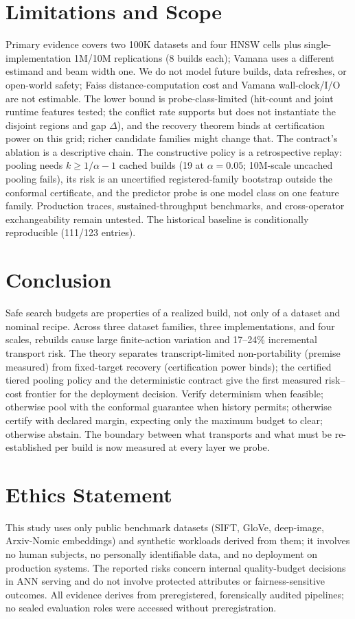 \documentclass{article}
\begin{document}
\section{Limitations and Scope}
\label{sec:limitations}

Primary evidence covers two 100K datasets and four HNSW cells plus single-implementation 1M/10M
replications (8 builds each); Vamana uses a different estimand and beam width one. We do not model future
builds, data refreshes, or open-world safety; Faiss distance-computation cost and Vamana wall-clock/I/O
are not estimable. The lower bound is probe-class-limited (hit-count and joint runtime features tested;
the conflict rate supports but does not instantiate the disjoint regions and gap $\Delta$), and the
recovery theorem binds at certification power on this grid; richer candidate families might change that.
The contract's ablation is a descriptive chain. The constructive policy is a retrospective replay:
pooling needs $k\ge 1/\alpha-1$ cached builds (19 at $\alpha{=}0.05$; 10M-scale uncached pooling
fails), its risk is an uncertified registered-family bootstrap outside the conformal certificate, and the
predictor probe is one model class on one feature family. Production traces, sustained-throughput
benchmarks, and cross-operator exchangeability remain untested. The historical baseline is conditionally
reproducible (111/123 entries).

\section{Conclusion}
\label{sec:conclusion}

Safe search budgets are properties of a realized build, not only of a dataset and nominal recipe.
Across three dataset families, three implementations, and four scales, rebuilds cause large
finite-action variation and 17--24\% incremental transport risk. The theory separates
transcript-limited non-portability (premise measured) from fixed-target recovery (certification power
binds); the certified tiered pooling policy and the deterministic contract give the first measured
risk--cost frontier for the deployment decision. Verify determinism when feasible; otherwise pool with
the conformal guarantee when history permits; otherwise certify with declared margin, expecting only the
maximum budget to clear; otherwise abstain. The boundary between what transports and what must be
re-established per build is now measured at every layer we probe.

\section*{Ethics Statement}
This study uses only public benchmark datasets (SIFT, GloVe, deep-image, Arxiv-Nomic embeddings) and
synthetic workloads derived from them; it involves no human subjects, no personally identifiable data,
and no deployment on production systems. The reported risks concern internal quality-budget decisions in
ANN serving and do not involve protected attributes or fairness-sensitive outcomes. All evidence derives
from preregistered, forensically audited pipelines; no sealed evaluation roles were accessed without
preregistration.
\end{document}
